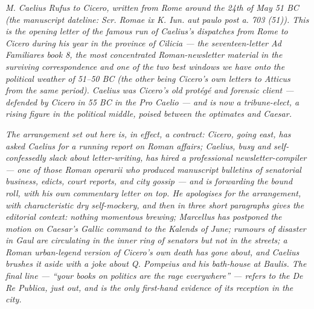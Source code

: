 
\textit{M. Caelius Rufus to Cicero, written from Rome
around the 24th of May 51 BC (the manuscript dateline:
\textit{Scr. Romae ix K. Iun. aut paulo post a. 703 (51)}).
This is the opening letter of the famous run of Caelius's
dispatches from Rome to Cicero during his year in the
province of Cilicia --- the seventeen-letter \textit{Ad
Familiares} book 8, the most concentrated Roman-newsletter
material in the surviving correspondence and one of the
two best windows we have onto the political weather of
51--50 BC (the other being Cicero's own letters to
Atticus from the same period). Caelius was Cicero's old
protégé and forensic client --- defended by Cicero in
55 BC in the \textit{Pro Caelio} --- and is now a
tribune-elect, a rising figure in the political middle,
poised between the optimates and Caesar.}

\textit{The arrangement set out here is, in effect, a
contract: Cicero, going east, has asked Caelius for a
running report on Roman affairs; Caelius, busy and
self-confessedly slack about letter-writing, has hired a
professional newsletter-compiler --- one of those Roman
\textit{operarii} who produced manuscript bulletins of
senatorial business, edicts, court reports, and city
gossip --- and is forwarding the bound roll, with his
own commentary letter on top. He apologises for the
arrangement, with characteristic dry self-mockery, and
then in three short paragraphs gives the editorial
context: nothing momentous brewing; Marcellus has
postponed the motion on Caesar's Gallic command to the
Kalends of June; rumours of disaster in Gaul are
circulating in the inner ring of senators but not in
the streets; a Roman urban-legend version of Cicero's
own death has gone about, and Caelius brushes it aside
with a joke about Q. Pompeius and his bath-house at
Baulis. The final line --- ``your books on politics are
the rage everywhere'' --- refers to the \textit{De Re
Publica}, just out, and is the only first-hand evidence
of its reception in the city.}
